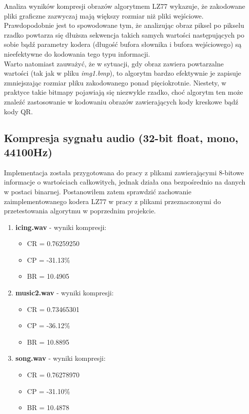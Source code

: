 \documentclass{article}
\begin{document}
Analiza wyników kompresji obrazów algorytmem LZ77 wykazuje, że zakodowane pliki graficzne zazwyczaj mają większy rozmiar niż pliki wejściowe. Prawdopodobnie jest to spowodowane tym, że analizując obraz piksel po pikselu rzadko powtarza się dłuższa sekwencja takich samych wartości następujących po sobie bądź parametry kodera (długość bufora słownika i bufora wejściowego) są nieefektywne do kodowania tego typu informacji.
\\Warto natomiast zauważyć, że w sytuacji, gdy obraz zawiera powtarzalne wartości (tak jak w pliku \textit{img1.bmp}), to algorytm bardzo efektywnie je zapisuje zmniejszając rozmiar pliku zakodowanego ponad pięciokrotnie. Niestety, w praktyce takie bitmapy pojawiają się niezwykle rzadko, choć algorytm ten może znaleźć zastosowanie w kodowaniu obrazów zawierających kody kreskowe bądź kody QR.
\subsection{Kompresja sygnału audio (32-bit float, mono, 44100Hz)}
Implementacja została przygotowana do pracy z plikami zawierającymi 8-bitowe informacje o wartościach całkowitych, jednak działa ona bezpośrednio na danych w postaci binarnej. Postanowiłem zatem sprawdzić zachowanie zaimplementowanego kodera LZ77 w pracy z plikami przeznaczonymi do przetestowania algorytmu w poprzednim projekcie.
\begin{enumerate}
\item \textbf{icing.wav} - wyniki kompresji:
    \begin{itemize}
        \item CR = 0.76259250
        \item CP = -31.13\%
        \item BR = 10.4905

    \end{itemize}
\item \textbf{music2.wav} - wyniki kompresji:
    \begin{itemize}
        \item CR = 0.73465301
        \item CP = -36.12\%
        \item BR = 10.8895
    \end{itemize}
\item \textbf{song.wav} - wyniki kompresji:
    \begin{itemize}
        \item CR = 0.76278970
        \item CP = -31.10\%
        \item BR = 10.4878
    \end{itemize}
\end{enumerate}
\end{document}
